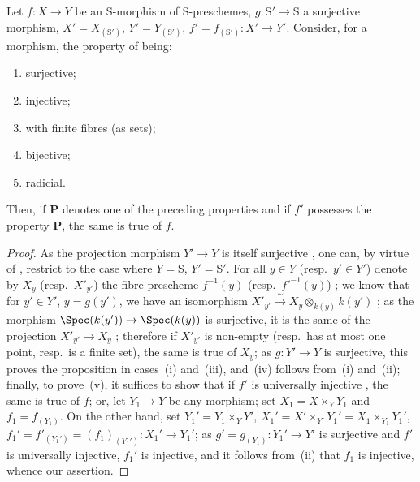 \begin{proposition}[2.6.1]
\label{IV.2.6.1}
Let $f:X\to Y$ be an $\mathrm{S}$-morphism of $\mathrm{S}$-preschemes, $g:\mathrm{S}'\to\mathrm{S}$
a surjective morphism, $X'=X_{(\mathrm{S}')}$, $Y'=Y_{(\mathrm{S}')}$, $f'=f_{(\mathrm{S}')}: X'\to Y'$. Consider, for a
morphism, the property of being:
\begin{enumerate}[label=(\roman*)]
  \item surjective;
  \item injective;
  \item with finite fibres (as sets);
  \item bijective;
  \item radicial.
\end{enumerate}
Then, if $\mathbf{P}$ denotes one of the preceding properties and if $f'$ possesses the property $\mathbf{P}$, the same is true
of $f$.
\end{proposition}

\begin{proof}
As the projection morphism $Y'\to Y$ is itself surjective , one can,
by virtue of , restrict to the case where $Y=\mathrm{S}$, $Y'=\mathrm{S}'$. For all $y\in Y$ (resp.\ $y'\in Y'$)
denote by $X_y$ (resp.\ $X'_{y'}$) the fibre prescheme $f^{-1}(y)$ (resp.\ $f'^{-1}(y)$) ; we know
that for $y'\in Y'$, $y=g(y')$, we have an isomorphism $X'_{y'}\xrightarrow{\;\sim\;}X_y\otimes_{k(y)}k(y')$ ;
as the morphism $\Spec(k(y'))\to\Spec(k(y))$ is surjective, it is the same of the
projection $X'_{y'}\to X_y$ ; therefore if $X'_{y'}$ is non-empty (resp.\ has at most one point, resp.\
is a finite set), the same is true of $X_y$; as $g:Y'\to Y$ is surjective, this
proves the proposition in cases~(i) and~(iii), and~(iv) follows from~(i) and~(ii);
finally, to prove~(v), it suffices to show that if $f'$ is universally injective
\sref[I]{I.3.5.11}, the same is true of $f$; or, let $Y_1\to Y$ be any morphism; set
$X_1=X\times_Y Y_1$ and $f_1=f_{(Y_1)}$. On the other hand, set $Y_1'=Y_1\times_Y Y'$, $X_1'=X'\times_{Y'}Y_1'=X_1\times_{Y_1}Y_1'$,
$f_1'=f'_{(Y_1')}=(f_1)_{(Y_1')}:X_1'\to Y_1'$;
as $g'=g_{(Y_1)}:Y_1'\to Y'$ is surjective  and $f'$
is universally injective, $f_1'$ is injective, and it follows from~(ii) that $f_1$ is injective, whence
our assertion.
\end{proof}

